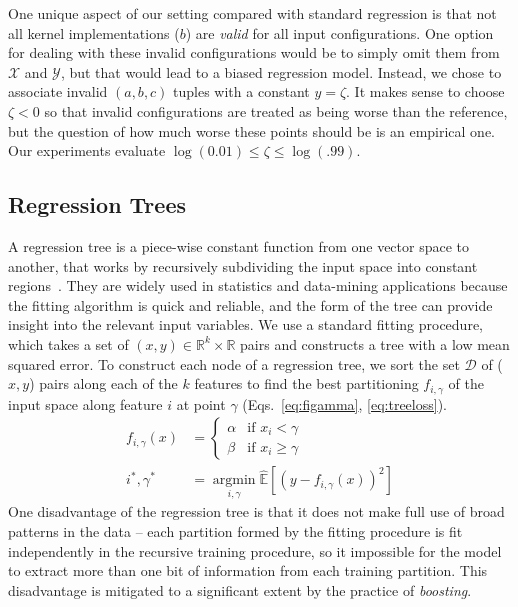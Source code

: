 \documentclass{sig-alternate}
\begin{document}
One unique aspect of our setting compared with standard regression
is that not all kernel implementations ($b$) are {\em valid}
for all input configurations. One option for dealing with these invalid configurations
would be to simply omit them from $\mathcal{X}$ and $\mathcal{Y}$, but that would lead to a biased regression model.
Instead, we chose to associate invalid $(a, b, c)$ tuples with a constant $y = \zeta$.
It makes sense to choose $\zeta < 0$ so that invalid configurations are treated as being worse than the reference,
but the question of how much worse these points should be is an empirical one.
Our experiments evaluate $\log(0.01) \leq \zeta \leq \log(.99)$.

\subsection{Regression Trees}
\label{sec:brtree}

A regression tree is a piece-wise constant function from one vector space to another,
that works by recursively subdividing the input space into constant regions~\citep{breiman+friedman+olshen+stone:1984, hastie+tibshirani+friedman:2001}.
They are widely used in statistics and data-mining applications because the fitting algorithm is quick and reliable, and the form of the tree can provide insight into the relevant input variables.
We use a standard fitting procedure, which takes a set of
$(x, y)\in \mathbb{R}^k \times \mathbb{R}$ pairs and constructs a tree with a low mean squared error.
To construct each node of a regression tree,
we sort the set $\mathcal{D}$ of ($x,y$) pairs along each of the $k$ features to find the best partitioning $f_{i,\gamma}$ of the input space along feature $i$ at point $\gamma$ (Eqs.~\ref{eq:figamma}, \ref{eq:treeloss}).
\begin{align}
    f_{i,\gamma}(x) &=
    \begin{cases}
        \alpha  &\text{if $x_i < \gamma$} \\
        \beta &\text{if $x_i \geq \gamma$}
    \end{cases}
    \label{eq:figamma}\\
    i^*, \gamma^* &= \operatorname*{argmin}_{i, \gamma} \mathbb{\hat E}\left[ (y - f_{i,\gamma}(x))^2 \right]
    \label{eq:treeloss}
\end{align}
One disadvantage of the regression tree is that it does not make full use of broad patterns in the data -- each partition formed by the fitting procedure is fit independently in the recursive training procedure,
so it impossible for the model to extract more than one bit of information from each training partition.
This disadvantage is mitigated to a significant extent by the practice of {\em boosting}.
\end{document}
